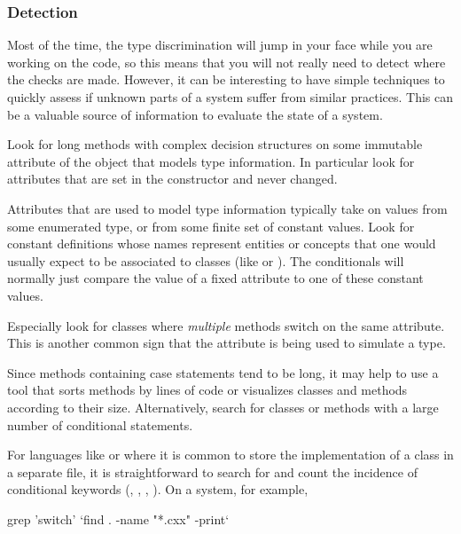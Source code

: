 \documentclass[a4paper,10pt,twoside]{book}
\begin{document}
\subsubsection*{Detection}

Most of the time, the type discrimination will jump in your face while you are working on the code, so this means that you will not really need to detect where the checks are made. However, it can be interesting to have simple techniques to quickly assess if unknown parts of a system suffer from similar practices. This can be a valuable source of information to evaluate the state of a system. 

\begin{bulletlist}
\item Look for long methods with complex decision structures on some immutable attribute of the object that models type information. In particular look for attributes that are set in the constructor and never changed.

\item Attributes that are used to model type information typically take on values from some enumerated type, or from some finite set of constant values. Look for constant definitions whose names represent entities or concepts that one would usually expect to be associated to classes (like  or ). The conditionals will normally just compare the value of a fixed attribute to one of these constant values.

\item Especially look for classes where \emph{multiple} methods switch on the same attribute. This is another common sign that the attribute is being used to simulate a type.

\item Since methods containing case statements tend to be long, it may help to use a tool that sorts methods by lines of code or visualizes classes and methods according to their size. Alternatively, search for classes or methods with a large number of conditional statements.

\item For languages like  or  where it is common to store the implementation of a class in a separate file, it is straightforward to search for and count the incidence of conditional keywords (, , , \etc). On a  system, for example,

\begin{code}
grep 'switch' `find . -name "*.cxx" -print`
\end{code}


\end{bulletlist}
\end{document}
